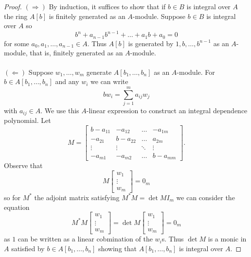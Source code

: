 \begin{proof}
  $(\Longrightarrow)$ By induction, it suffices to show that if $b\in B$ is integral over $A$ the ring $A[b]$ is finitely generated as an $A$-module. Suppose $b\in B$ is integral over $A$ so 
  $$b^{n}+a_{n-1}b^{n-1}+\dots+a_{1}b+a_{0}=0$$
  for some $a_{0}, a_{1},\dots, a_{n-1}\in A$. Thus $A[b]$ is generated by $1, b, \dots,b^{n-1}$ as an $A$-module, that is, finitely generated as an $A$-module. 
  \\\\
  $(\Longleftarrow)$ Suppose $w_{1},\dots,w_{m}$ generate $A[b_{1},\dots,b_{n}]$ as an $A$-module. For $b\in A[b_{1},\dots,b_{n}]$ and any $w_{i}$ we can write 
  $$bw_{i}=\sum_{j=1}^{m}a_{ij}w_{j}$$
  with $a_{ij}\in A$. We use this $A$-linear expression to construct an integral dependence polynomial. Let 
  $$M=\begin{bmatrix}
    b-a_{11} & -a_{12} & \dots & -a_{1m} \\
    -a_{21} & b-a_{22} & \dots & a_{2m} \\
    \vdots & \vdots & \ddots & \vdots \\
    -a_{m1} & -a_{m2} & \dots & b-a_{mm}
  \end{bmatrix}.$$
  Observe that 
  $$M\begin{bmatrix}
    w_{1} \\ \vdots \\ w_{m}
  \end{bmatrix}=0_{m}$$
  so for $M^{*}$ the adjoint matrix satisfying $M^{*}M=\det M I_{m}$ we can consider the equation 
  $$M^{*}M\begin{bmatrix} w_{1}\\ \vdots\\ w_{m}\end{bmatrix}=\det M\begin{bmatrix}
    w_{1} \\ \vdots \\ w_{m}
  \end{bmatrix}=0_{m}$$
  as $1$ can be written as a linear cobmination of the $w_{i}$s. Thus $\det M$ is a monic in $A$ satisfied by $b\in A[b_{1},\dots,b_{n}]$ showing that $A[b_{1},\dots,b_{n}]$ is integral over $A$. 
\end{proof}